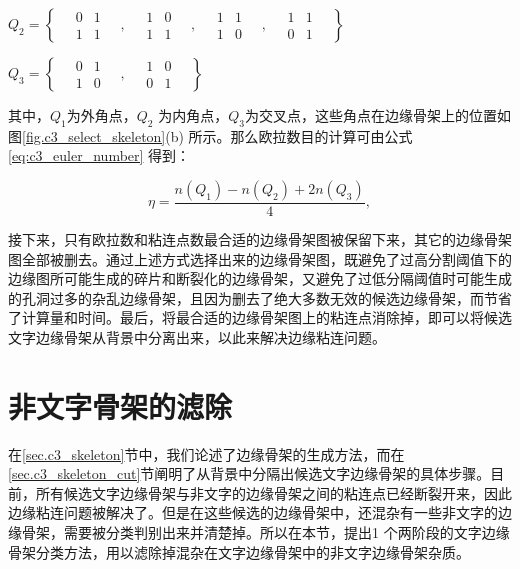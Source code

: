         $Q_2 = \left\{
        \quad
        \begin{matrix} 0 & 1 \\ 1 & 1 \end{matrix}\quad,\quad
        \begin{matrix} 1 & 0 \\ 1 & 1 \end{matrix}\quad,\quad
        \begin{matrix} 1 & 1 \\ 1 & 0 \end{matrix}\quad,\quad
        \begin{matrix} 1 & 1 \\ 0 & 1 \end{matrix}
        \quad
        \right\}$

        $Q_3 = \left\{
        \quad
        \begin{matrix} 0 & 1 \\ 1 & 0 \end{matrix}\quad,\quad
        \begin{matrix} 1 & 0 \\ 0 & 1
        \end{matrix}
        \quad
        \right\}$

        其中，$Q_1$为外角点，$Q_2$ 为内角点，$Q_3$为交叉点，这些角点在边缘骨架上的位置如图\ref{fig.c3_select_skeleton}(b) 所示。那么欧拉数目的计算可由公式\ref{eq:c3_euler_number} 得到：

        \begin{equation}
        \eta=\frac{n(Q_1)-n(Q_2)+2n(Q_3)}{4},
        \label{eq:c3_euler_number}
        \end{equation}

        接下来，只有欧拉数和粘连点数最合适的边缘骨架图被保留下来，其它的边缘骨架图全部被删去。通过上述方式选择出来的边缘骨架图，既避免了过高分割阈值下的边缘图所可能生成的碎片和断裂化的边缘骨架，又避免了过低分隔阈值时可能生成的孔洞过多的杂乱边缘骨架，且因为删去了绝大多数无效的候选边缘骨架，而节省了计算量和时间。最后，将最合适的边缘骨架图上的粘连点消除掉，即可以将候选文字边缘骨架从背景中分离出来，以此来解决边缘粘连问题。

    \section{非文字骨架的滤除}

    在\ref{sec.c3_skeleton}节中，我们论述了边缘骨架的生成方法，而在\ref{sec.c3_skeleton_cut}节阐明了从背景中分隔出候选文字边缘骨架的具体步骤。目前，所有候选文字边缘骨架与非文字的边缘骨架之间的粘连点已经断裂开来，因此边缘粘连问题被解决了。但是在这些候选的边缘骨架中，还混杂有一些非文字的边缘骨架，需要被分类判别出来并清楚掉。所以在本节，提出1 个两阶段的文字边缘骨架分类方法，用以滤除掉混杂在文字边缘骨架中的非文字边缘骨架杂质。

